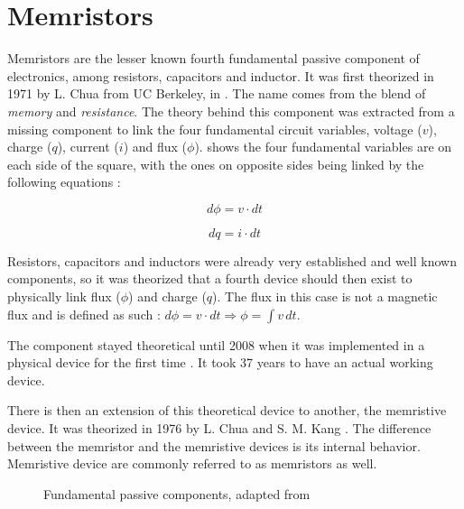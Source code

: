 \section{Memristors}
\label{sec:memristors}

Memristors are the lesser known fourth fundamental passive component of electronics, among resistors, capacitors and inductor.
It was first theorized in 1971 by L. Chua from UC Berkeley, in \cite{TheoMemristor}. The name comes from the blend of \textit{memory} and \textit{resistance}.
The theory behind this component was extracted from a missing component to link the four fundamental circuit variables, voltage ($v$), charge ($q$), current ($i$) and flux ($\phi$).  shows the four fundamental variables are on each side of the square, with the ones on opposite sides being linked by the following equations :

\begin{equation}
  d\phi = v\cdot dt
\end{equation}

\begin{equation}
  dq = i\cdot dt
\end{equation}

Resistors, capacitors and inductors were already very established and well known components, so it was theorized that a fourth device should then exist to physically link flux ($\phi$) and charge ($q$).  The flux in this case is not a magnetic flux and is defined as such : $ d\phi=v\cdot dt \Rightarrow \phi =  \int v \,dt  $.

The component stayed theoretical until 2008 when it was implemented in a physical device for the first time \cite{memristorFab}. It took 37 years to have an actual working device.

There is then an extension of this theoretical device to another, the memristive device. It was theorized in 1976 by L. Chua and S. M. Kang \cite{memrestiveDev}. The difference between the memristor and the memristive devices is its internal behavior. Memristive device are commonly referred to as memristors as well.

\begin{figure}[H]
  \centering
  
  \caption{Fundamental passive components, adapted from \cite{memWiki}}
  \label{fig:fundComp}
\end{figure}

